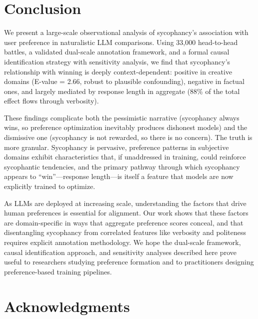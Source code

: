 \documentclass[11pt,twocolumn,a4paper]{article}
\begin{document}
\section{Conclusion}
\label{sec:conclusion}

We present a large-scale observational analysis of sycophancy's
association with user preference in naturalistic LLM comparisons.
Using 33,000 head-to-head battles, a validated dual-scale annotation
framework, and a formal causal identification strategy with sensitivity
analysis, we find that sycophancy's relationship with winning is
deeply context-dependent: positive in creative domains (E-value = 2.66,
robust to plausible confounding), negative in factual ones, and
largely mediated by response length in aggregate (88\% of the total
effect flows through verbosity).

These findings complicate both the pessimistic narrative (sycophancy
always wins, so preference optimization inevitably produces dishonest
models) and the dismissive one (sycophancy is not rewarded, so there
is no concern). The truth is more granular. Sycophancy is pervasive,
preference patterns in subjective domains exhibit characteristics
that, if unaddressed in training, could reinforce sycophantic
tendencies, and the primary pathway through which sycophancy appears
to ``win''---response length---is itself a feature that models are
now explicitly trained to optimize.

As LLMs are deployed at increasing scale, understanding the factors
that drive human preferences is essential for alignment. Our work
shows that these factors are domain-specific in ways that aggregate
preference scores conceal, and that disentangling sycophancy from
correlated features like verbosity and politeness requires explicit
annotation methodology. We hope the dual-scale framework, causal
identification approach, and sensitivity analyses described here
prove useful to researchers studying preference formation and to
practitioners designing preference-based training pipelines.



\section*{Acknowledgments}
\end{document}
